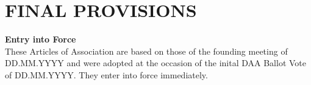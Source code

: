 \section{FINAL PROVISIONS}\label{sec:final-provisions}

\item \textbf{Entry into Force} \\
These Articles of Association are based on those of the founding meeting of DD.MM.YYYY and were adopted at the occasion of the inital DAA Ballot Vote of DD.MM.YYYY.
They enter into force immediately.

